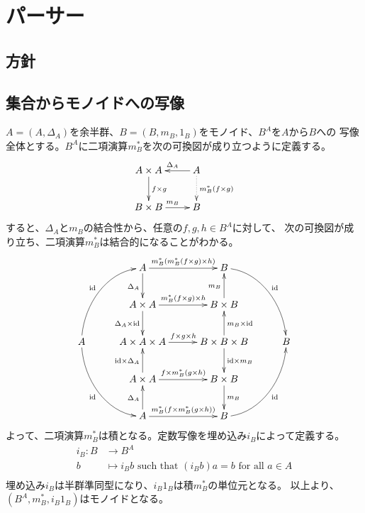 \section{パーサー}\label{s1:パーサー} %
\subsection{方針}\label{s2:方針} %

\subsection{集合からモノイドへの写像}\label{s2:集合からモノイドへの写像} %
$A=(A,\Delta_A)$を余半群、$B=(B,m_B,1_B)$をモノイド、$B^A$を$A$から$B$への
写像全体とする。$B^A$に二項演算$m_B^*$を次の可換図が成り立つように定義する。
\begin{equation}\xymatrix{ %
	A \times A \ar[d]^{f \times g} & A \ar[l]_{\Delta_A} \ar@{.>}[d]^{m_B^*(f \times g)} \\
	B \times B \ar[r]^{m_B} & B \\
}\end{equation} %
すると、$\Delta_A$と$m_B$の結合性から、任意の$f,g,h\in B^A$に対して、
次の可換図が成り立ち、二項演算$m_B^*$は結合的になることがわかる。
\begin{equation}\label{eq:誘導された二項演算の結合性}\xymatrix@C+1ex{
		& A \ar[d]_{\Delta_A} \ar[r]^{m_B^*(m_B^*(f\times g)\times h)}
		& B \ar@(r,u)[rdd]^{\myid} 
		\\
		& A\times A \ar[d]_{\Delta_A\times \myid} \ar[r]^{m_B^*(f\times g)\times h}
		& B\times B \ar[u]^{m_B}
		\\
	A \ar@(u,l)[ruu]^{\myid} \ar@(d,l)[rdd]_{\myid} 
		& A\times A\times A \ar[r]^{f\times g\times h}
		& B\times B\times B \ar[u]_{m_B\times \myid} \ar[d]^{\myid\times m_B}
		& B 
		\\
		& A\times A \ar[u]^{\myid\times \Delta_A} \ar[r]^{f\times m_B^*(g\times h)}
		& B\times B \ar[d]^{m_B}
		\\
		& A \ar[u]^{\Delta_A} \ar[r]^{m_B^*(f\times m_B^*(g\times h))}
		& B \ar@(r,d)[ruu]_{\myid}
		\\
}\end{equation}
よって、二項演算$m_B^*$は積となる。定数写像を埋め込み$i_B$によって定義する。
\begin{equation}\label{eq:constant-map}\begin{split} %
	i_B: B &\to B^A \\
		b &\mapsto i_Bb \text{ such that } (i_Bb)a = b \text{ for all }a\in A \\
\end{split}\end{equation} %
埋め込み$i_B$は半群準同型になり、$i_B1_B$は積$m_B^*$の単位元となる。
以上より、$(B^A,m_B^*,i_B1_B)$はモノイドとなる。

